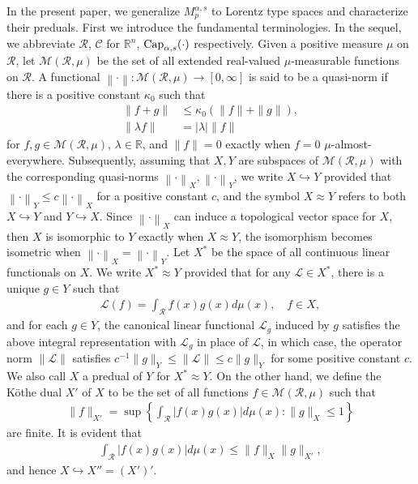 \documentclass[10pt,reqno]{amsart}
\numberwithin{equation}{section}
\begin{document}
In the present paper, we generalize $M_{p}^{\alpha,s}$ to Lorentz type spaces and characterize their preduals. First we introduce the fundamental terminologies. In the sequel, we abbreviate $\mathcal{R}$, $\mathcal{C}$ for $\mathbb{R}^{n}$,  ${\rm Cap}_{\alpha,s}(\cdot)$ respectively. Given a positive measure $\mu$ on $\mathcal{R}$, let $\mathcal{M}(\mathcal{R},\mu)$ be the set of all extended real-valued $\mu$-measurable functions on $\mathcal{R}$. A functional $\left\|\cdot\right\|:\mathcal{M}(\mathcal{R},\mu)\rightarrow[0,\infty]$ is said to be a quasi-norm if there is a positive constant $\kappa_{0}$ such that 
\begin{align*}
\|f+g\|&\leq\kappa_{0}(\|f\|+\|g\|),\\
\|\lambda f\|&=|\lambda|\|f\|
\end{align*}
for $f,g\in\mathcal{M}(\mathcal{R},\mu)$, $\lambda\in\mathbb{R}$, and $\|f\|=0$ exactly when $f=0$ $\mu$-almost-everywhere. Subsequently, assuming that $X,Y$ are subspaces of $\mathcal{M}(\mathcal{R},\mu)$ with the corresponding quasi-norms $\left\|\cdot\right\|_{X},\left\|\cdot\right\|_{Y}$, we write $X\hookrightarrow Y$ provided that $\left\|\cdot\right\|_{Y}\leq c\left\|\cdot\right\|_{X}$ for a positive constant $c$, and the symbol $X\approx Y$ refers to both $X\hookrightarrow Y$ and $Y\hookrightarrow X$. Since $\left\|\cdot\right\|_{X}$ can induce a topological vector space for $X$, then $X$ is isomorphic to $Y$ exactly when $X\approx Y$, the isomorphism becomes isometric when $\left\|\cdot\right\|_{X}=\left\|\cdot\right\|_{Y}$. Let $X^{\ast}$ be the space of all continuous linear functionals on $X$. We write $X^{\ast}\approx Y$ provided that for any $\mathcal{L}\in X^{\ast}$, there is a unique $g\in Y$ such that 
\begin{align*}
\mathcal{L}(f)=\int_{\mathcal{R}}f(x)g(x)d\mu(x),\quad f\in X,
\end{align*} 
and for each $g\in Y$, the canonical linear functional $\mathcal{L}_{g}$ induced by $g$ satisfies the above integral representation with $\mathcal{L}_{g}$ in place of $\mathcal{L}$, in which case, the operator norm $\|\mathcal{L}\|$ satisfies $c^{-1}\|g\|_{Y}\leq\|\mathcal{L}\|\leq c\|g\|_{Y}$ for some positive constant $c$. We also call $X$ a predual of $Y$ for $X^{\ast}\approx Y$. On the other hand, we define the K\"othe dual $X'$ of $X$ to be the set of all functions $f\in\mathcal{M}(\mathcal{R},\mu)$ such that 
\begin{align*}
\|f\|_{X'}=\sup\left\{\int_{\mathcal{R}}|f(x)g(x)|d\mu(x):\|g\|_{X}\leq 1\right\}
\end{align*}
are finite. It is evident that 
\begin{align*}
\int_{\mathcal{R}}|f(x)g(x)|d\mu(x)\leq\|f\|_{X}\|g\|_{X'},
\end{align*}
and hence $X\hookrightarrow X''=(X')'$.
\end{document}
